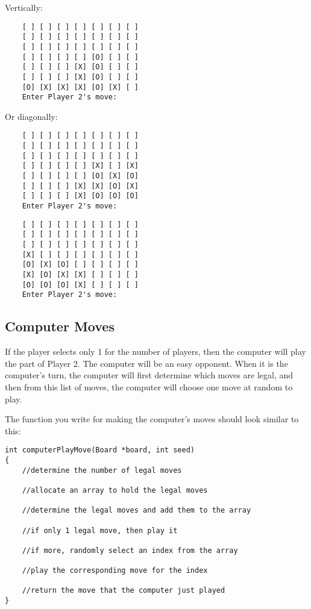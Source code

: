 \documentclass{article}
\begin{document}
Vertically:

\begin{verbatim}
    [ ] [ ] [ ] [ ] [ ] [ ] [ ]
    [ ] [ ] [ ] [ ] [ ] [ ] [ ]
    [ ] [ ] [ ] [ ] [ ] [ ] [ ]
    [ ] [ ] [ ] [ ] [O] [ ] [ ]
    [ ] [ ] [ ] [X] [O] [ ] [ ]
    [ ] [ ] [ ] [X] [O] [ ] [ ]
    [O] [X] [X] [X] [O] [X] [ ]
    Enter Player 2's move:
\end{verbatim}

Or diagonally:

\begin{verbatim}
    [ ] [ ] [ ] [ ] [ ] [ ] [ ]
    [ ] [ ] [ ] [ ] [ ] [ ] [ ]
    [ ] [ ] [ ] [ ] [ ] [ ] [ ]
    [ ] [ ] [ ] [ ] [X] [ ] [X]
    [ ] [ ] [ ] [ ] [O] [X] [O]
    [ ] [ ] [ ] [X] [X] [O] [X]
    [ ] [ ] [ ] [X] [O] [O] [O]
    Enter Player 2's move:
\end{verbatim}

\begin{verbatim}
    [ ] [ ] [ ] [ ] [ ] [ ] [ ]
    [ ] [ ] [ ] [ ] [ ] [ ] [ ]
    [ ] [ ] [ ] [ ] [ ] [ ] [ ]
    [X] [ ] [ ] [ ] [ ] [ ] [ ]
    [O] [X] [O] [ ] [ ] [ ] [ ]
    [X] [O] [X] [X] [ ] [ ] [ ]
    [O] [O] [O] [X] [ ] [ ] [ ]
    Enter Player 2's move:
\end{verbatim}

\subsection{Computer Moves}

If the player selects only 1 for the number of players, then
the computer will play the part of Player 2. The computer
will be an easy opponent. When it is the computer's turn, 
the computer will first determine which moves are legal, and
then from this list of moves, the computer will choose one
move at random to play.

The function you write for making the computer's moves should
look similar to this:

\begin{verbatim}
int computerPlayMove(Board *board, int seed)
{
	//determine the number of legal moves 

	//allocate an array to hold the legal moves

	//determine the legal moves and add them to the array

	//if only 1 legal move, then play it

	//if more, randomly select an index from the array
	
	//play the corresponding move for the index

	//return the move that the computer just played
}
\end{verbatim}
\end{document}

